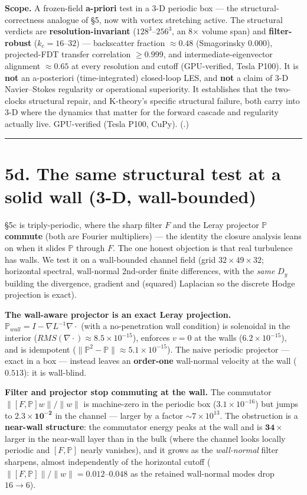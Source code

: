 \documentclass[11pt]{article}
\begin{document}
\textbf{Scope.} A frozen-field \textbf{a-priori} test in a 3-D periodic box — the structural-correctness analogue of §5, now with vortex stretching active. The structural verdicts are \textbf{resolution-invariant} ($128^{3}$--$256^{3}$, an 8\ensuremath{\times} volume span) and \textbf{filter-robust} ($k_{c}=16$--$32$) --- backscatter fraction $\approx 0.48$ (Smagorinsky $0.000$), projected-FDT transfer correlation $\geq 0.999$, and intermediate-eigenvector alignment $\approx 0.65$ at every resolution and cutoff (GPU-verified, Tesla P100). It is \textbf{not} an a-posteriori (time-integrated) closed-loop LES, and \textbf{not} a claim of 3-D Navier–Stokes regularity or operational superiority. It establishes that the two-clocks structural repair, and K-theory's specific structural failure, both carry into 3-D where the dynamics that matter for the forward cascade and regularity actually live. GPU-verified (Tesla P100, CuPy). (.)


\medskip\hrule\medskip


\section*{5d. The same structural test at a solid wall (3-D, wall-bounded)}


\S5c is triply-periodic, where the sharp filter $F$ and the Leray projector $\mathbb{P}$ \textbf{commute} (both are Fourier multipliers) --- the identity the closure analysis leans on when it slides $\mathbb{P}$ through $F$. The one honest objection is that real turbulence has walls. We test it on a wall-bounded channel field (grid $32\times 49\times 32$; horizontal spectral, wall-normal 2nd-order finite differences, with the \emph{same} $D_{y}$ building the divergence, gradient and (squared) Laplacian so the discrete Hodge projection is exact).


\textbf{The wall-aware projector is an exact Leray projection.} $\mathbb{P}_{wall}=I-\nabla L^{-1}\nabla \cdot $ (with a no-penetration wall condition) is solenoidal in the interior ($RMS(\nabla \cdot )\approx 8.5\times 10^{-15}$), enforces $v=0$ at the walls ($6.2\times 10^{-15}$), and is idempotent ($\|\mathbb{P}^{2}-\mathbb{P}\|\approx 5.1\times 10^{-15}$). The naive periodic projector --- exact in a box --- instead leaves an \textbf{order-one} wall-normal velocity at the wall ($0.513$): it is wall-blind.


\textbf{Filter and projector stop commuting at the wall.} The commutator $\|[F,\mathbb{P}]w\|/\|w\|$ is machine-zero in the periodic box ($3.1\times 10^{-16}$) but jumps to $\mathbf{2.3\times 10^{-2}}$ in the channel --- larger by a factor $\sim 7\times 10^{13}$. The obstruction is a \textbf{near-wall structure}: the commutator energy peaks at the wall and is $\mathbf{34\times}$ larger in the near-wall layer than in the bulk (where the channel looks locally periodic and $[F,\mathbb{P}]$ nearly vanishes), and it grows as the \emph{wall-normal} filter sharpens, almost independently of the horizontal cutoff ($\|[F,\mathbb{P}]\|/\|w\|=0.012$--$0.048$ as the retained wall-normal modes drop $16\to 6$).
\end{document}
